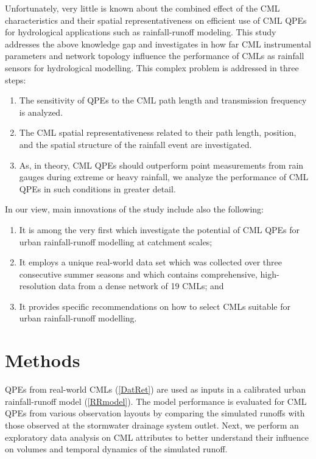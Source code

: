 \documentclass{ctuthesis}\usepackage[]{graphicx}\usepackage[]{color}
\begin{document}
Unfortunately, very little is known about the combined effect of the CML characteristics and their spatial representativeness on efficient use of CML QPEs for hydrological applications such as rainfall-runoff modeling. This study addresses the above knowledge gap and investigates in how far CML instrumental parameters and network topology influence the performance of CMLs as rainfall sensors for hydrological modelling. This complex problem is addressed in three steps: 
        \begin{enumerate}
        \itemsep0em 
                \item{The sensitivity of QPEs to the CML path length and transmission frequency is  analyzed.}
                \item{The CML spatial representativeness related to their path length, position, and the spatial structure of the rainfall event are investigated.}
                \item{As, in theory, CML QPEs should outperform point measurements from rain gauges during extreme or heavy rainfall, we analyze the performance of CML QPEs in such conditions in greater detail.}
        \end{enumerate}

In our view, main innovations of the study include also the following:
        \begin{enumerate}
        \itemsep0em 
                \item{It is among the very first which investigate the potential of CML QPEs for urban rainfall-runoff modelling at catchment scales;}
                \item{It employs a unique real-world data set which was collected over three consecutive summer seasons and which contains comprehensive, high-resolution data from a dense network of 19 CMLs; and}
                \item{It provides specific recommendations on how to select CMLs suitable for urban rainfall-runoff modelling.}
        \end{enumerate}
        
 
\section{Methods} \label{paperIMnM}

QPEs from real-world CMLs (\ref{DatRet}) are used as inputs in a calibrated urban rainfall-runoff model (\ref{RRmodel}). The model performance is evaluated for CML QPEs from various observation layouts by comparing the simulated runoffs with those observed at the stormwater drainage system outlet. Next, we perform an exploratory data analysis on CML attributes to better understand their influence on volumes and temporal dynamics of the simulated runoff. 
\end{document}
